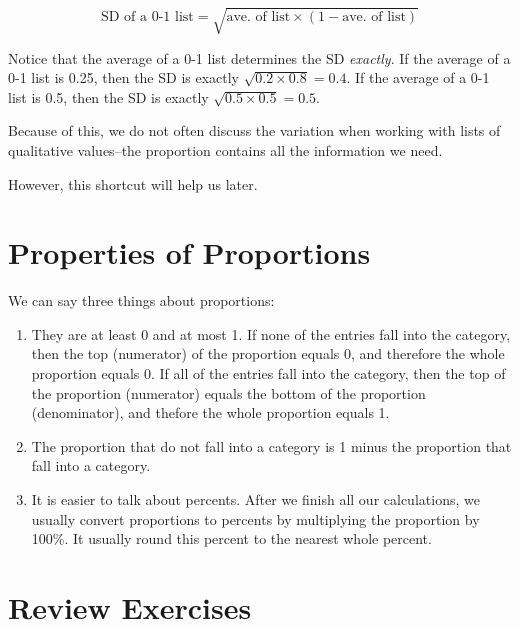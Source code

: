 \documentclass[]{book}
\providecommand{\tightlist}{%
  \setlength{\itemsep}{0pt}\setlength{\parskip}{0pt}}
\theoremstyle{definition}
\theoremstyle{definition}
\theoremstyle{definition}
\theoremstyle{remark}
\begin{document}
\[\text{SD of a 0-1 list} = \sqrt{\text{ave. of list} \times (1 - \text{ave. of list})}\]

Notice that the average of a 0-1 list determines the SD \emph{exactly}.
If the average of a 0-1 list is 0.25, then the SD is exactly
\(\sqrt{0.2 \times 0.8} = 0.4\). If the average of a 0-1 list is 0.5,
then the SD is exactly \(\sqrt{0.5 \times 0.5} = 0.5\).

Because of this, we do not often discuss the variation when working with
lists of qualitative values--the proportion contains all the information
we need.

However, this shortcut will help us later.

\section{Properties of Proportions}\label{properties-of-proportions}

We can say three things about proportions:

\begin{enumerate}
\def\labelenumi{\arabic{enumi}.}
\tightlist
\item
  They are at least 0 and at most 1. If none of the entries fall into
  the category, then the top (numerator) of the proportion equals 0, and
  therefore the whole proportion equals 0. If all of the entries fall
  into the category, then the top of the proportion (numerator) equals
  the bottom of the proportion (denominator), and thefore the whole
  proportion equals 1.
\item
  The proportion that do not fall into a category is 1 minus the
  proportion that fall into a category.
\item
  It is easier to talk about percents. After we finish all our
  calculations, we usually convert proportions to percents by
  multiplying the proportion by 100\%. It usually round this percent to
  the nearest whole percent.
\end{enumerate}

\section{Review Exercises}\label{review-exercises-1}
\end{document}
